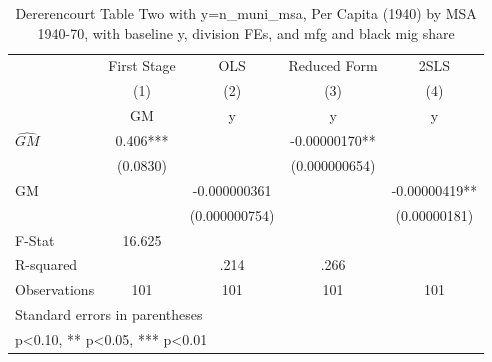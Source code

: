 \begin{table}[htbp]\centering
\def\sym#1{\ifmmode^{#1}\else\(^{#1}\)\fi}
\caption{Dererencourt Table Two with y=n\_muni\_msa, Per Capita (1940) by MSA 1940-70, with baseline y, division FEs, and mfg and black mig share}
\begin{tabular}{l*{4}{c}}
\toprule
                    & First Stage   &         OLS   &Reduced Form   &        2SLS   \\
                    &\multicolumn{1}{c}{(1)}&\multicolumn{1}{c}{(2)}&\multicolumn{1}{c}{(3)}&\multicolumn{1}{c}{(4)}\\
                    &\multicolumn{1}{c}{GM}&\multicolumn{1}{c}{y}&\multicolumn{1}{c}{y}&\multicolumn{1}{c}{y}\\
\midrule
$\hat{GM}$          &       0.406***&               & -0.00000170** &               \\
                    &    (0.0830)   &               &(0.000000654)   &               \\
\addlinespace
GM                  &               &-0.000000361   &               & -0.00000419** \\
                    &               &(0.000000754)   &               &(0.00000181)   \\
\midrule
F-Stat              &      16.625   &               &               &               \\
R-squared           &               &        .214   &        .266   &               \\
Observations        &         101   &         101   &         101   &         101   \\
\bottomrule
\multicolumn{5}{l}{\footnotesize Standard errors in parentheses}\\
\multicolumn{5}{l}{\footnotesize * p<0.10, ** p<0.05, *** p<0.01}\\
\end{tabular}
\end{table}
